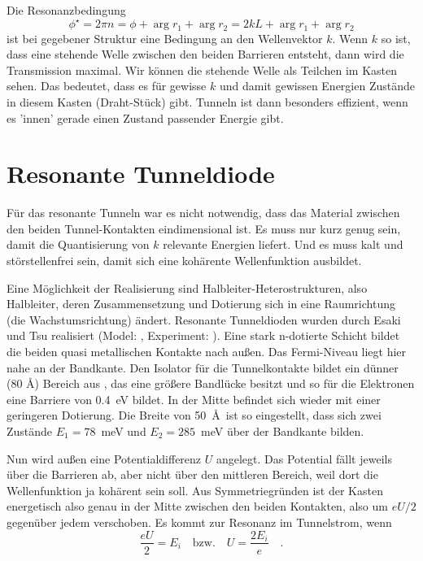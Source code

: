 Die Resonanzbedingung 
\begin{equation}
    \phi^\star = 2 \pi n =  \phi  + \arg r_1 + \arg r_2 = 2 k L + \arg r_1 + \arg r_2
\end{equation}
ist bei gegebener Struktur eine Bedingung an den Wellenvektor $k$. Wenn $k$ so ist, dass eine stehende Welle zwischen den beiden Barrieren entsteht, dann wird die Transmission maximal. Wir können die stehende Welle als Teilchen im Kasten sehen. Das bedeutet, dass es für gewisse $k$ und damit gewissen Energien Zustände in diesem Kasten (Draht-Stück) gibt. Tunneln ist dann besonders effizient, wenn es 'innen' gerade einen Zustand passender Energie gibt.


\section{Resonante Tunneldiode}

Für das resonante Tunneln  war es nicht notwendig, dass das Material zwischen den beiden Tunnel-Kontakten eindimensional ist. Es muss nur kurz genug sein, damit die Quantisierung von $k$ relevante Energien liefert. Und es muss kalt und störstellenfrei sein, damit sich eine kohärente Wellenfunktion ausbildet.

Eine Möglichkeit der Realisierung sind Halbleiter-Heterostrukturen, also Halbleiter, deren Zusammensetzung und Dotierung sich in eine Raumrichtung (die Wachstumsrichtung) ändert. Resonante Tunneldioden wurden durch Esaki und Tsu realisiert (Model: \cite{Tsu1973}, Experiment: \cite{Chang1974}). Eine stark n-dotierte Schicht  bildet die beiden quasi metallischen Kontakte nach außen. Das Fermi-Niveau liegt hier nahe an der Bandkante. Den Isolator für die Tunnelkontakte bildet ein dünner (80 \AA) Bereich aus , das eine größere Bandlücke besitzt und so für die Elektronen eine Barriere von 0.4~eV bildet. In der Mitte befindet sich wieder  mit einer geringeren Dotierung. Die Breite von 50~\AA\  ist so eingestellt, dass sich zwei Zustände $E_1 = 78$~meV und $E_2 =285$~meV über der Bandkante bilden.

Nun wird außen eine Potentialdifferenz $U$ angelegt. Das Potential fällt jeweils über die Barrieren ab, aber nicht über den mittleren Bereich, weil dort die Wellenfunktion ja kohärent sein soll. Aus Symmetriegründen ist der Kasten energetisch also genau in der Mitte zwischen den beiden Kontakten, also um $eU/2$ gegenüber jedem verschoben. Es kommt zur Resonanz im Tunnelstrom, wenn
\begin{equation}
    \frac{e U }{2 } = E_i \quad \text{bzw.} \quad U = \frac{2 E_i}{e}  \quad .
\end{equation}

